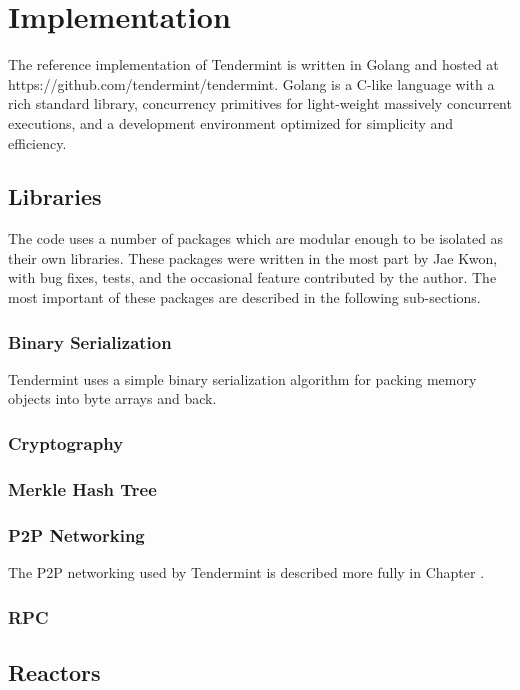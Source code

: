 \chapter{Implementation}
\label{ch:implementation}

The reference implementation of Tendermint is written in Golang \cite{golang} and hosted at https://github.com/tendermint/tendermint.
Golang is a C-like language with a rich standard library, concurrency primitives for light-weight massively concurrent executions,
and a development environment optimized for simplicity and efficiency.

\section{Libraries}

The code uses a number of packages which are modular enough to be isolated as their own libraries.
These packages were written in the most part by Jae Kwon, with bug fixes, tests, and the occasional feature contributed by the author.
The most important of these packages are described in the following sub-sections.

\subsection{Binary Serialization}

Tendermint uses a simple binary serialization algorithm for packing memory objects into byte arrays and back.


\subsection{Cryptography}
\subsection{Merkle Hash Tree}
\subsection{P2P Networking}

The P2P networking used by Tendermint is described more fully in Chapter \cite{ch:networking}.

\subsection{RPC}

\section{Reactors}

